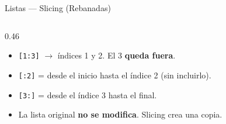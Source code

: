 \documentclass[aspectratio=169, 11pt]{beamer}
\begin{document}
\begin{frame}[fragile,shrink=25]{Listas --- Slicing (Rebanadas)}
\begin{columns}[T]
    \begin{column}{0.46\textwidth}
      {\footnotesize\color{textMuted}
      \begin{itemize}\setlength{\itemsep}{4pt}
        \item[{\color{arcaRed}\scriptsize\faArrowRight}]
          \texttt{[1:3]} $\rightarrow$ índices 1 y 2.
          El 3 \textbf{queda fuera}.
        \item[{\color{arcaRed}\scriptsize\faArrowRight}]
          \texttt{[:2]} = desde el inicio hasta
          el índice 2 (sin incluirlo).
        \item[{\color{arcaRed}\scriptsize\faArrowRight}]
          \texttt{[3:]} = desde el índice 3
          hasta el final.
        \item[{\color{arcaRed}\scriptsize\faArrowRight}]
          La lista original \textbf{no se modifica}.
          Slicing crea una copia.
      \end{itemize}
      }
    \end{column}
  \end{columns}
\end{frame}
\end{document}

